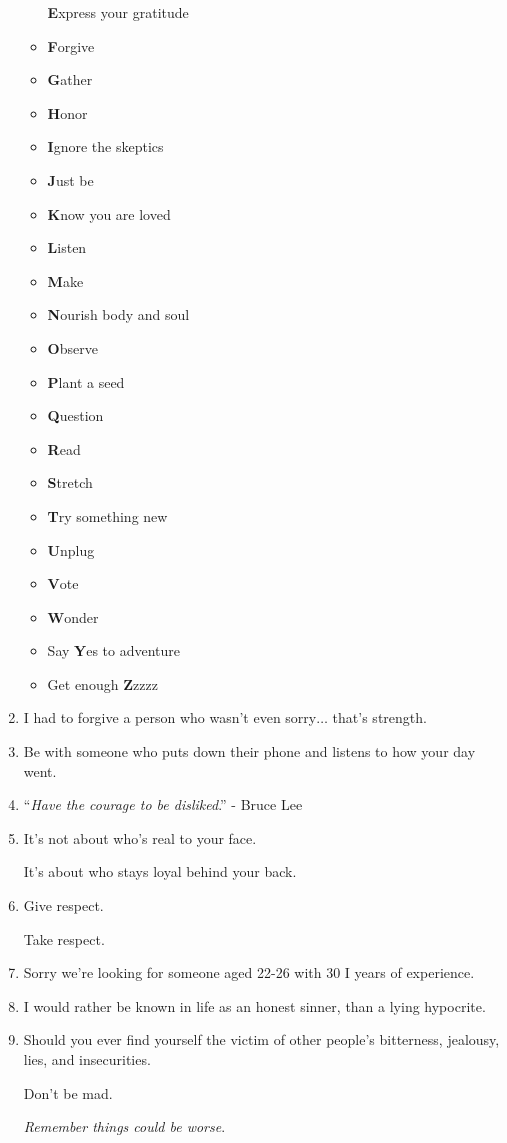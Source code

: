 \documentclass{article}
\begin{document}
\begin{enumerate}
\begin{itemize}
		\textbf{E}xpress your gratitude
		\item \textbf{F}orgive
		\item \textbf{G}ather
		\item \textbf{H}onor
		\item \textbf{I}gnore the skeptics
		\item \textbf{J}ust be
		\item \textbf{K}now you are loved
		\item \textbf{L}isten
		\item \textbf{M}ake
		\item \textbf{N}ourish body and soul
		\item \textbf{O}bserve
		\item \textbf{P}lant a seed
		\item \textbf{Q}uestion
		\item \textbf{R}ead
		\item \textbf{S}tretch
		\item \textbf{T}ry something new
		\item \textbf{U}nplug
		\item \textbf{V}ote
		\item \textbf{W}onder
		\item Say \textbf{Y}es to adventure
		\item Get enough \textbf{Z}zzzz
	\end{itemize}
	\item I had to forgive a person who wasn't even sorry$\ldots$ that's strength.
	\item Be with someone who puts down their phone and listens to how your day went.
	\item ``\textit{Have the courage to be disliked}.'' - Bruce Lee
	\item It's not about who's real to your face.
	
	It's about who stays loyal behind your back.
	\item Give respect.
	
	Take respect.
	\item Sorry we're looking for someone aged 22-26 with 30 I years of experience.
	\item I would rather be known in life as an honest sinner, than a lying hypocrite.
	\item Should you ever find yourself the victim of other people's bitterness, jealousy, lies, and insecurities.
	
	Don't be mad.
	
	\textit{Remember things could be worse}.
	

\end{enumerate}
\end{document}
